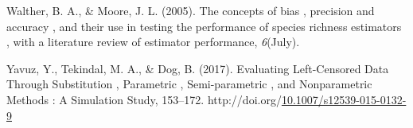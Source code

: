 \documentclass[12pt, twoside]{amherstthesis}
\newenvironment{CSLReferences}%
  {}%
  {\par}
\begin{document}
\begin{CSLReferences}{1}{0}
\leavevmode\hypertarget{ref-Walther2005}{}%
Walther, B. A., \& Moore, J. L. (2005). {The concepts of bias , precision and accuracy , and their use in testing the performance of species richness estimators , with a literature review of estimator performance}, \emph{6}(July).

\leavevmode\hypertarget{ref-Yavuz2017}{}%
Yavuz, Y., Tekindal, M. A., \& Dog, B. (2017). {Evaluating Left-Censored Data Through Substitution , Parametric , Semi-parametric , and Nonparametric Methods : A Simulation Study}, 153--172. http://doi.org/\href{https://doi.org/10.1007/s12539-015-0132-9}{10.1007/s12539-015-0132-9}

\end{CSLReferences}
\end{document}
